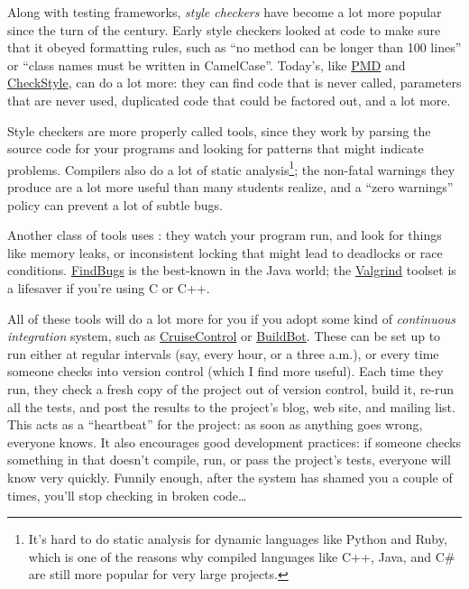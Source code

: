 \documentclass{report}
\begin{document}
Along with testing frameworks, \emph{style checkers} have become a lot
more popular since the turn of the century.  Early style checkers
looked at code to make sure that it obeyed formatting rules, such as
``no method can be longer than 100 lines'' or ``class names must be
written in CamelCase''.  Today's, like \url{PMD} and \url{CheckStyle},
can do a lot more: they can find code that is never called, parameters
that are never used, duplicated code that could be factored out, and a
lot more.

Style checkers are more properly called 
tools, since they work by parsing the source code for your programs
and looking for patterns that might indicate problems.  Compilers also
do a lot of static analysis\footnote{It's hard to do static analysis
for dynamic languages like Python and Ruby, which is one of the
reasons why compiled languages like C++, Java, and C\# are still more
popular for very large projects.}; the non-fatal warnings they produce
are a lot more useful than many students realize, and a ``zero
warnings'' policy can prevent a lot of subtle bugs.

Another class of tools uses : they watch
your program run, and look for things like memory leaks, or
inconsistent locking that might lead to deadlocks or race conditions.
\url{FindBugs} is the best-known in the Java world; the \url{Valgrind}
toolset is a lifesaver if you're using C or C++.

All of these tools will do a lot more for you if you adopt some kind
of \emph{continuous integration} system, such as \url{CruiseControl}
or \url{BuildBot}.  These can be set up to run either at regular
intervals (say, every hour, or a three a.m.), or every time someone
checks into version control (which I find more useful).  Each time
they run, they check a fresh copy of the project out of version
control, build it, re-run all the tests, and post the results to the
project's blog, web site, and mailing list.  This acts as a
``heartbeat'' for the project: as soon as anything goes wrong,
everyone knows.  It also encourages good development practices: if
someone checks something in that doesn't compile, run, or pass the
project's tests, everyone will know very quickly.  Funnily enough,
after the system has shamed you a couple of times, you'll stop
checking in broken code{\ldots}
\end{document}
